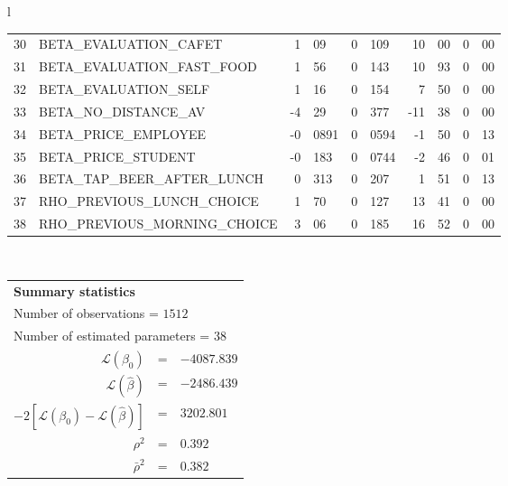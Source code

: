 \begin{tabular}{l}
\begin{tabular}{rlr@{.}lr@{.}lr@{.}lr@{.}l}
30 & BETA_EVALUATION_CAFET & 1&09 & 0&109 & 10&00 & 0&00\\
31 & BETA_EVALUATION_FAST_FOOD & 1&56 & 0&143 & 10&93 & 0&00\\
32 & BETA_EVALUATION_SELF & 1&16 & 0&154 & 7&50 & 0&00\\
33 & BETA_NO_DISTANCE_AV & -4&29 & 0&377 & -11&38 & 0&00\\
34 & BETA_PRICE_EMPLOYEE & -0&0891 & 0&0594 & -1&50 & 0&13\\
35 & BETA_PRICE_STUDENT & -0&183 & 0&0744 & -2&46 & 0&01\\
36 & BETA_TAP_BEER_AFTER_LUNCH & 0&313 & 0&207 & 1&51 & 0&13\\
37 & RHO_PREVIOUS_LUNCH_CHOICE & 1&70 & 0&127 & 13&41 & 0&00\\
38 & RHO_PREVIOUS_MORNING_CHOICE & 3&06 & 0&185 & 16&52 & 0&00\\
\hline
\end{tabular}
\\
\begin{tabular}{rcl}
\multicolumn{3}{l}{\bf Summary statistics}\\
\multicolumn{3}{l}{ Number of observations = $1512$} \\
\multicolumn{3}{l}{ Number of estimated  parameters = $38$} \\
 $\mathcal{L}(\beta_0)$ &=&  $-4087.839$ \\
 $\mathcal{L}(\hat{\beta})$ &=& $-2486.439 $  \\
 $-2[\mathcal{L}(\beta_0) -\mathcal{L}(\hat{\beta})]$ &=& $3202.801$ \\
    $\rho^2$ &=&   $0.392$ \\
    $\bar{\rho}^2$ &=&    $0.382$ \\
\end{tabular}
  \end{tabular}
